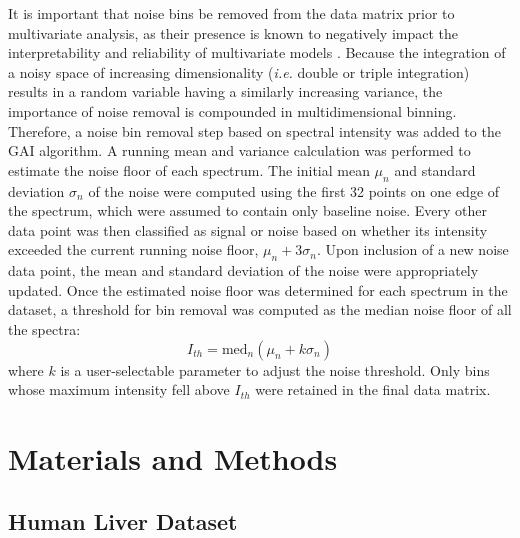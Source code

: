\begin{doublespace}
It is important that noise bins be removed from the data matrix prior to
multivariate analysis, as their presence is known to negatively impact the
interpretability and reliability of multivariate models
\cite{halouska:jmr2006,bro:anmeth2014}. Because the integration of a
noisy space of increasing dimensionality ({\it i.e.} double or triple
integration) results in a random variable having a similarly increasing
variance, the importance of noise removal is compounded in multidimensional
binning. Therefore, a noise bin removal step based on spectral intensity was
added to the GAI algorithm. A running mean and variance calculation was
performed to estimate the noise floor of each spectrum. The initial mean
$\mu_n$ and standard deviation $\sigma_n$ of the noise were computed using the
first 32 points on one edge of the spectrum, which were assumed to contain only
baseline noise. Every other data point was then classified as signal or noise
based on whether its intensity exceeded the current running noise floor,
$\mu_n + 3 \sigma_n$. Upon inclusion of a new noise data point, the mean and
standard deviation of the noise were appropriately updated. Once the estimated
noise floor was determined for each spectrum in the dataset, a threshold for
bin removal was computed as the median noise floor of all the spectra:
\begin{equation}
I_{th} = \mathrm{med}_n (\mu_n + k \sigma_n)
\end{equation}
where $k$ is a user-selectable parameter to adjust the noise threshold. Only
bins whose maximum intensity fell above $I_{th}$ were retained in the final
data matrix.
\end{doublespace}

\section{Materials and Methods}

\subsection{Human Liver Dataset}

